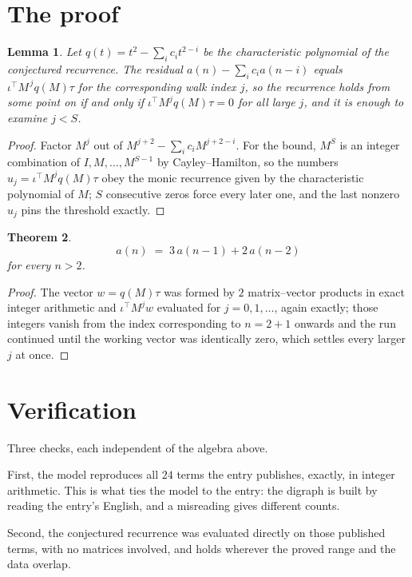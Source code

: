 \documentclass[11pt,a4paper]{article}
\theoremstyle{plain}
\newtheorem{theorem}{Theorem}
\newtheorem{lemma}[theorem]{Lemma}
\theoremstyle{definition}
\begin{document}
\section{The proof}

\begin{lemma}\label{lem:crit}
Let $q(t)=t^{2}-\sum_i c_it^{2-i}$ be the characteristic polynomial of the
conjectured recurrence. The residual $a(n)-\sum_ic_ia(n-i)$ equals
$\iota^{\!\top}M^{\,j}q(M)\tau$ for the corresponding walk index $j$, so the recurrence
holds from some point on if and only if $\iota^{\!\top}M^{j}q(M)\tau=0$ for all large $j$,
and it is enough to examine $j<S$.
\end{lemma}

\begin{proof}
Factor $M^{j}$ out of $M^{j+2}-\sum_ic_iM^{j+2-i}$. For the bound, $M^{S}$
is an integer combination of $I,M,\dots,M^{S-1}$ by Cayley--Hamilton, so the numbers
$u_j=\iota^{\!\top}M^{j}q(M)\tau$ obey the monic recurrence given by the characteristic
polynomial of $M$; $S$ consecutive zeros force every later one, and the last nonzero $u_j$
pins the threshold exactly.
\end{proof}

\begin{theorem}
\[
a(n)\;=\;3\,a(n-1) + 2\,a(n-2)
\]
for every $n>2$.
\end{theorem}

\begin{proof}
The vector $w=q(M)\tau$ was formed by $2$ matrix--vector products in exact integer
arithmetic and $\iota^{\!\top}M^{j}w$ evaluated for $j=0,1,\dots$, again exactly; those
integers vanish from the index corresponding to $n=2+1$ onwards and the run continued
until the working vector was identically zero, which settles every larger $j$ at once.
\end{proof}

\section{Verification}

Three checks, each independent of the algebra above.

First, the model reproduces all $24$ terms the entry publishes, exactly, in integer
arithmetic. This is what ties the model to the entry: the digraph is built by reading the
entry's English, and a misreading gives different counts.

Second, the conjectured recurrence was evaluated directly on those published terms, with no
matrices involved, and holds wherever the proved range and the data overlap.
\end{document}
